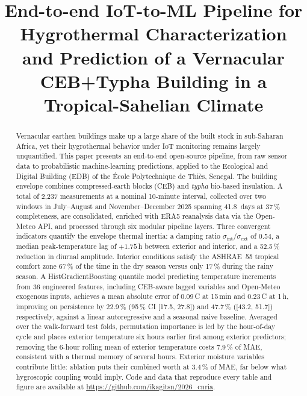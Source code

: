\documentclass[conference]{IEEEtran}
\newcommand{\repourl}{\url{https://github.com/ikagitsn/2026_cnria}}
\newcommand{\ceb}{CEB+Typha\xspace}
\newcommand{\sigrat}{$\sigma_\text{int}/\sigma_\text{ext}$\xspace}
\begin{document}
\title{End-to-end IoT-to-ML Pipeline for Hygrothermal Characterization
  and Prediction of a Vernacular \ceb Building in a Tropical-Sahelian Climate}

\author{
}

\maketitle

\begin{abstract}
Vernacular earthen buildings make up a large share of the
built stock in sub-Saharan Africa, yet their hygrothermal behavior under
IoT monitoring remains largely unquantified. This paper presents an
end-to-end open-source pipeline, from raw sensor data to probabilistic
machine-learning predictions, applied to the Ecological and Digital
Building (EDB) of the École Polytechnique de Thiès, Senegal. The building
envelope combines compressed-earth blocks (CEB) and \textit{typha}
bio-based insulation. A total of 2,237 measurements at a nominal
10-minute interval, collected over two windows in July--August and
November--December 2025 spanning 41.8~days at 37\,\% completeness, are
consolidated, enriched with ERA5 reanalysis data via the Open-Meteo API,
and processed through six modular pipeline layers. Three convergent indicators quantify the
envelope thermal inertia: a damping ratio \sigrat of 0.54, a median
peak-temperature lag of $+1.75$\,h between exterior and interior, and a
52.5\,\% reduction in diurnal amplitude. Interior conditions satisfy the
ASHRAE~55 tropical comfort zone 67\,\% of the time in the dry season
versus only 17\,\% during the rainy season. A HistGradientBoosting
quantile model predicting temperature increments from 36 engineered
features, including CEB-aware lagged variables and Open-Meteo exogenous
inputs, achieves a mean absolute error of 0.09\,\textdegree{}C at
15\,min and 0.23\,\textdegree{}C at 1\,h, improving on persistence by 22.9\,\% (95\,\% CI [17.5, 27.8]) and
47.7\,\% ([43.2, 51.7]) respectively, against a linear autoregressive
and a seasonal naive baseline.
Averaged over the walk-forward test folds, permutation importance is
led by the hour-of-day cycle and places exterior temperature six hours
earlier first among exterior predictors; removing the 6-hour rolling
mean of exterior temperature costs 7.9\,\% of MAE, consistent with a
thermal memory of several hours. Exterior
moisture variables contribute little: ablation puts their combined
worth at 3.4\,\% of MAE, far below what hygroscopic coupling would
imply. Code and data that
reproduce every table and figure are available at \repourl.
\end{abstract}
\end{document}
